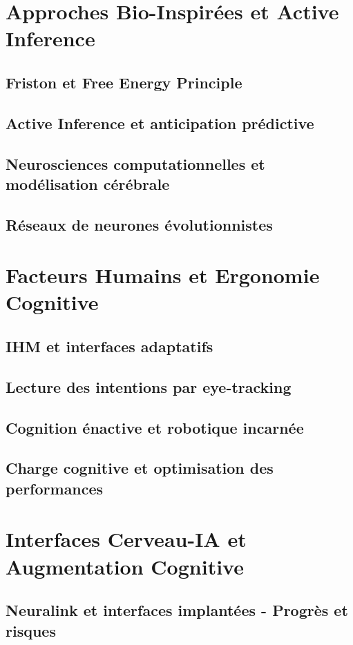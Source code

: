 \documentclass[12pt,a4paper]{book}
\begin{document}
\chapter{Approches Bio-Inspirées et Active Inference}
\section{Friston et Free Energy Principle}
\section{Active Inference et anticipation prédictive}
\section{Neurosciences computationnelles et modélisation cérébrale}
\section{Réseaux de neurones évolutionnistes}

\chapter{Facteurs Humains et Ergonomie Cognitive}
\section{IHM et interfaces adaptatifs}
\section{Lecture des intentions par eye-tracking}
\section{Cognition énactive et robotique incarnée}
\section{Charge cognitive et optimisation des performances}

\chapter{Interfaces Cerveau-IA et Augmentation Cognitive}
\section{Neuralink et interfaces implantées - Progrès et risques}
\end{document}

